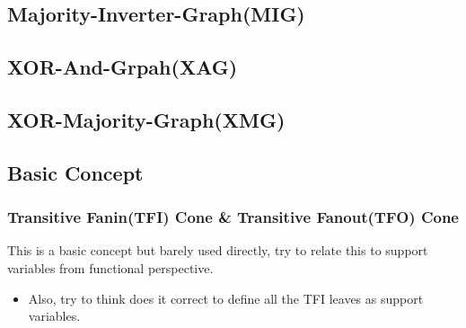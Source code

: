 \documentclass[main.tex]{subfiles}
\begin{document}
\subsection{Majority-Inverter-Graph(MIG)}

\subsection{XOR-And-Grpah(XAG)}

\subsection{XOR-Majority-Graph(XMG)}

\subsection{Basic Concept}
\subsubsection{Transitive Fanin(TFI) Cone \& Transitive Fanout(TFO) Cone}
This is a basic concept but barely used directly, try to relate this to support variables from functional perspective.
\begin{itemize}
    \item Also, try to think does it correct to define all the TFI leaves as support variables.
\end{itemize}
\end{document}
